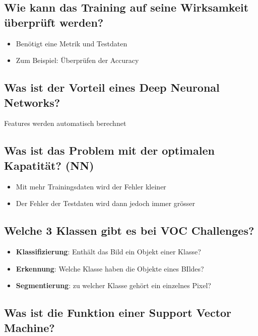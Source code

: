\documentclass[a4paper]{article}
\begin{document}
		\subsection{Wie kann das Training auf seine Wirksamkeit überprüft werden?}
		
		\begin{itemize}
			\item Benötigt eine Metrik und Testdaten
			\item Zum Beispiel: Überprüfen der Accuracy
		\end{itemize}
	
		\subsection{Was ist der Vorteil eines Deep Neuronal Networks?}
		
		Features werden automatisch berechnet
		
		\subsection{Was ist das Problem mit der optimalen Kapatität? (NN)}
		
		\begin{itemize}
			\item Mit mehr Trainingsdaten wird der Fehler kleiner
			\item Der Fehler der Testdaten wird dann jedoch immer grösser
		\end{itemize}
	
		\subsection{Welche 3 Klassen gibt es bei VOC Challenges?}
		
		\begin{itemize}
			\item \textbf{Klassifizierung}: Enthält das Bild ein Objekt einer Klasse?
			\item \textbf{Erkennung}: Welche Klasse haben die Objekte eines BIldes?
			\item \textbf{Segmentierung}: zu welcher Klasse gehört ein einzelnes Pixel?
		\end{itemize}
	
		\subsection{Was ist die Funktion einer Support Vector Machine?}
		
\end{document}
